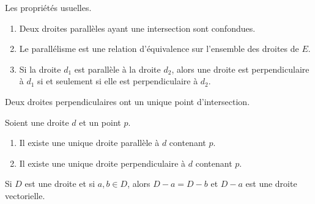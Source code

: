 \begin{proposition}     \label{PROPooADJNooMyXUxG}
	Les propriétés usuelles.
	\begin{enumerate}
		\item
		      Deux droites parallèles ayant une intersection sont confondues.
		\item
		      Le parallélisme est une relation d'équivalence sur l'ensemble des droites de \( E\).
		\item
		      Si la droite \( d_1\) est parallèle à la droite \( d_2\), alors une droite est perpendiculaire à \( d_1\) si et seulement si elle est perpendiculaire à \( d_2\).
	\end{enumerate}
\end{proposition}

\begin{lemma}       \label{LEMooRLFQooJADark}
	Deux droites perpendiculaires ont un unique point d'intersection.
\end{lemma}

\begin{proposition}     \label{PROPooPWNWooYuyrOc}
	Soient une droite \( d\) et un point \( p\).
	\begin{enumerate}
		\item
		      Il existe une unique droite parallèle à \( d\) contenant \( p\).
		\item
		      Il existe une unique droite perpendiculaire à \( d\) contenant \( p\).
	\end{enumerate}
\end{proposition}

\begin{lemma}       \label{LEMooQQFFooEZYeck}
	Si \( D\) est une droite et si \( a,b\in D\), alors \( D-a=D-b\) et \( D-a\) est une droite vectorielle.
\end{lemma}

